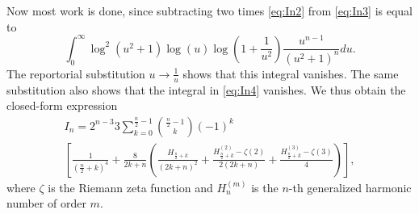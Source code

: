 %
Now most work is done, since subtracting two times \cref{eq:In2} from
\cref{eq:In3} is equal to
\begin{equation*}
    \int_0^\infty \log^2(u^2+1)\log (u) \log\left(1+\frac{1}{u^2}\right)
        \frac{u^{n-1}}{(u^2+1)^n} du.
\end{equation*}
The reportorial substitution $u\to\frac{1}{u}$ shows that this integral
vanishes. The same substitution also shows that the integral in  \cref{eq:In4}
vanishes.  We thus obtain the closed-form expression 
\begin{multline*}
    I_n = 2^{n-3} 3 \sum_{k=0}^{\frac{n}{2}-1} \binom{\frac{n}{2}-1}k  
            (-1)^k  \\
        \left[\frac1{(\frac{n}{2}+k)^4} +
            \frac{8}{2k+n} \left(\frac{H_{\frac{n}{2} + k}}{(2k+n)^2}
                + \frac{H^{(2)}_{\frac{n}{2}+k} - \zeta(2)}{2(2k+n)}
            + \frac{H^{(3)}_{\frac{n}{2}+k} - \zeta(3)}{4}
        \right)\right],
\end{multline*}
where $\zeta$ is the Riemann zeta function and $H_n^{(m)}$ is the $n$-th
generalized harmonic number of order $m$.
